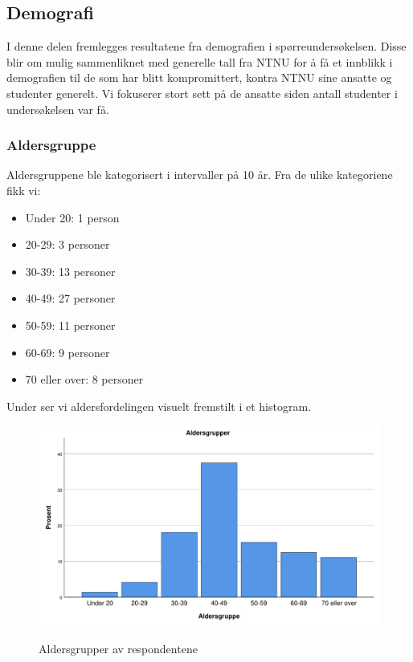 \subsection{Demografi}
I denne delen fremlegges resultatene fra demografien i spørreundersøkelsen. Disse blir om mulig sammenliknet med generelle tall fra NTNU for å få et innblikk i demografien til de som har blitt kompromittert, kontra NTNU sine ansatte og studenter generelt. Vi fokuserer stort sett på de ansatte siden antall studenter i undersøkelsen var få.

\subsubsection{Aldersgruppe}
Aldersgruppene ble kategorisert i intervaller på 10 år. Fra de ulike kategoriene fikk vi:

\begin{itemize}
    \item Under 20: 1 person
    \item 20-29: 3 personer
    \item 30-39: 13 personer
    \item 40-49: 27 personer
    \item 50-59: 11 personer
    \item 60-69: 9 personer
    \item 70 eller over: 8 personer
\end{itemize}

Under ser vi aldersfordelingen visuelt fremstilt i et histogram.

\begin{figure}[H]
    \centering
    \includegraphics[scale=0.5]{case_2/bilder/spss/aldersgrupper.pdf}
    \label{fig:case2-aldersgruppe}
    \caption[Aldersgrupper av de kompromitterte]{Aldersgrupper av respondentene}
\end{figure}

